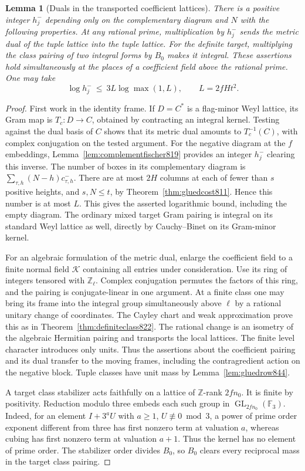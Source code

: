 \documentclass[a4paper,11pt]{article}
\newtheorem{lemma}[proposition]{Lemma}
\theoremstyle{definition}
\theoremstyle{remark}
\numberwithin{equation}{section}
\begin{document}
\begin{lemma}[Duals in the transported coefficient lattices]
\leavevmode\label{lem:glueddual845}
There is a positive integer \(h_j^-\) depending only on the
complementary diagram and \(N\) with the following properties.
At any rational prime, multiplication by \(h_j^-\) sends the
metric dual of the tuple lattice into the tuple lattice. For the
definite target, multiplying the class pairing of two integral
forms by \(B_0\) makes it integral. These assertions hold
simultaneously at the places of a coefficient field above the
rational prime. One may take
\[
 \log h_j^-\ \le\ 3L\log\max(1,L),\qquad L=2fHt^2 .
\]
\end{lemma}
\begin{proof}
First work in the identity frame. If \(D=C^*\) is a flag-minor
Weyl lattice, its Gram map is \(T_c:D\to C\), obtained by
contracting an integral kernel. Testing against the dual basis
of \(C\) shows that its metric dual amounts to
\(T_c^{-1}(C)\), with complex conjugation on the tested
argument. For the negative diagram at the \(f\) embeddings,
Lemma~\ref{lem:complementfischer819} provides an integer
\(h_j^-\) clearing this inverse. The number of boxes in its
complementary diagram is
\(\sum_{\tau,h}(N-h)c^-_{\tau,h}\).
There are at most \(2H\) columns at each of fewer than \(s\)
positive heights, and \(s,N\le t\), by
Theorem~\ref{thm:gluedcost811}. Hence this number is at most \(L\).
This gives the asserted logarithmic bound, including the empty
diagram. The ordinary mixed target Gram pairing is integral on its
standard Weyl lattice as well, directly by Cauchy--Binet on its
Gram-minor kernel.

For an algebraic formulation of the metric dual, enlarge the
coefficient field to a finite normal field \(\mathcal K\) containing
all entries under consideration. Use its ring of integers tensored
with \(\mathbb Z_\ell\). Complex conjugation permutes the factors
of this ring, and the pairing is conjugate-linear in one argument.
At a finite class one may bring its frame into the integral group
simultaneously above \(\ell\) by a rational unitary change of
coordinates. The Cayley chart and weak approximation prove this as
in Theorem~\ref{thm:definiteclass822}. The rational change is an
isometry of the algebraic Hermitian pairing and transports the
local lattices. The finite level character introduces only units.
Thus the assertions about the coefficient pairing and its dual
transfer to the moving frames, including the contragredient action
on the negative block. Tuple classes have unit mass by
Lemma~\ref{lem:gluedrow844}.

A target class stabilizer acts faithfully on a lattice of
\(\mathbb Z\)-rank \(2fn_0\). It is finite by positivity. Reduction
modulo three embeds each such group in
\(\operatorname{GL}_{2fn_0}(\mathbb F_3)\). Indeed, for an element
\(I+3^a U\) with \(a\ge1\), \(U\not\equiv0\bmod3\), a power of
prime order exponent different from three has first nonzero term
at valuation \(a\), whereas cubing has first nonzero term at
valuation \(a+1\). Thus the kernel has no element of prime order.
The stabilizer order divides \(B_0\), so \(B_0\) clears every
reciprocal mass in the target class pairing.
\end{proof}
\end{document}
